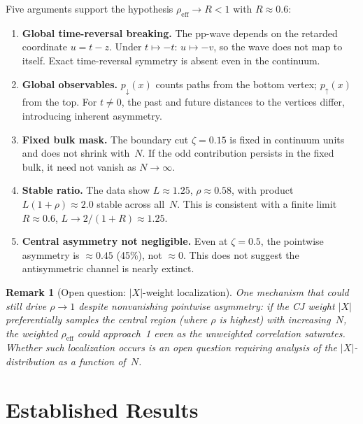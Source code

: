 \documentclass[11pt,a4paper]{article}
\newtheorem{remark}{Remark}
\begin{document}
Five arguments support the hypothesis $\rho_{\mathrm{eff}} \to R < 1$
with $R \approx 0.6$:

\begin{enumerate}
\item \textbf{Global time-reversal breaking.}
  The pp-wave depends on the retarded coordinate $u = t - z$.
  Under $t \mapsto -t$: $u \mapsto -v$, so the wave does not map to itself.
  Exact time-reversal symmetry is absent even in the continuum.

\item \textbf{Global observables.}
  $p_\downarrow(x)$ counts paths from the bottom vertex; $p_\uparrow(x)$
  from the top.  For $t \neq 0$, the past and future distances to the
  vertices differ, introducing inherent asymmetry.

\item \textbf{Fixed bulk mask.}
  The boundary cut $\zeta = 0.15$ is fixed in continuum units and does
  not shrink with~$N$.  If the odd contribution persists in the fixed bulk,
  it need not vanish as $N \to \infty$.

\item \textbf{Stable ratio.}
  The data show $L \approx 1.25$, $\rho \approx 0.58$, with product
  $L(1{+}\rho) \approx 2.0$ stable across all~$N$.  This is consistent
  with a finite limit $R \approx 0.6$, $L \to 2/(1{+}R) \approx 1.25$.

\item \textbf{Central asymmetry not negligible.}
  Even at $\zeta = 0.5$, the pointwise asymmetry is $\approx 0.45$ (45\%),
  not $\approx 0$.  This does not suggest the antisymmetric channel is
  nearly extinct.
\end{enumerate}

\begin{remark}[Open question: $|X|$-weight localization]
  One mechanism that could still drive $\rho \to 1$ despite nonvanishing
  pointwise asymmetry: if the CJ weight $|X|$ preferentially samples
  the central region (where $\rho$ is highest) with increasing~$N$,
  the weighted $\rho_{\mathrm{eff}}$ could approach~1 even as the
  unweighted correlation saturates.  Whether such localization occurs
  is an open question requiring analysis of the $|X|$-distribution
  as a function of~$N$.
\end{remark}

\section{Established Results}
\end{document}
